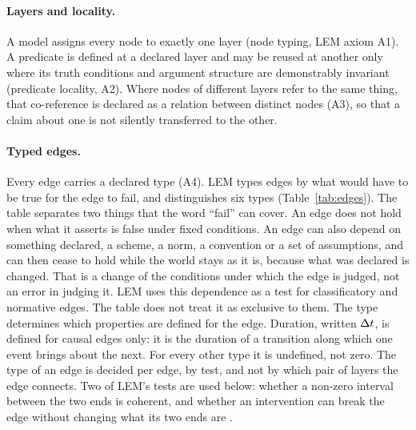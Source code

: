 \paragraph{Layers and locality.} A model assigns every node to exactly one layer (node
typing, LEM axiom A1). A predicate is defined at a declared layer and may be reused at
another only where its truth conditions and argument structure are demonstrably invariant
(predicate locality, A2). Where nodes of different layers refer to the same thing, that
co-reference is declared as a relation between distinct nodes (A3), so that a claim about
one is not silently transferred to the other.

\paragraph{Typed edges.} Every edge carries a declared type (A4). LEM types edges by what
would have to be true for the edge to fail, and distinguishes six types
(Table~\ref{tab:edges}). The table separates two things that the word ``fail'' can cover.
An edge does not hold when what it asserts is false under fixed conditions. An edge can
also depend on something declared, a scheme, a norm, a convention or a set of
assumptions, and can then cease to hold while the world stays as it is, because what
was declared is changed. That is a change of the conditions under which the edge is
judged, not an error in judging it. LEM uses this dependence as a test for
classificatory and normative edges. The table does not treat it as exclusive to them.
The type determines which properties are defined for the edge.
Duration, written $\Delta t$, is defined for causal edges only: it is the duration of a
transition along which one event brings about the next. For every other type it is
undefined, not zero. The type of an edge is decided per edge, by test, and not by which
pair of layers the edge connects. Two of LEM's tests are used below: whether a non-zero
interval between the two ends is coherent, and whether an intervention can break the edge
without changing what its two ends are \citep{woodward2003}.

